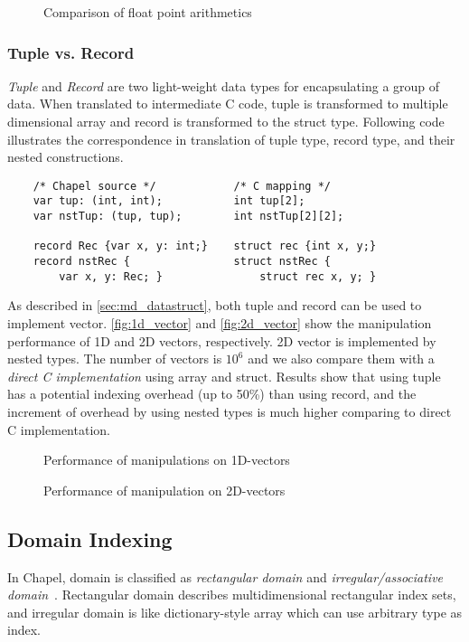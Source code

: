 \begin{figure}[t]
\centering

\caption{Comparison of float point arithmetics}
\label{fig:arith}
\end{figure}

\subsubsection{Tuple vs. Record}\label{sec:tuple_record}
{\em Tuple} and {\em Record} are two light-weight data types for encapsulating a
group of data. When translated to intermediate C code, tuple is transformed to
multiple dimensional array and record is transformed to the {\ic struct} type.
Following code illustrates the correspondence in translation of {\ic tuple}
type, {\ic record} type, and their nested constructions.

\begin{lstlisting}
    /* Chapel source */            /* C mapping */
    var tup: (int, int);           int tup[2];
    var nstTup: (tup, tup);        int nstTup[2][2];

    record Rec {var x, y: int;}    struct rec {int x, y;}
    record nstRec {                struct nstRec {
        var x, y: Rec; }               struct rec x, y; }
\end{lstlisting}

As described in \autoref{sec:md_datastruct}, both {\ic tuple} and {\ic
record} can be used to implement vector. \autoref{fig:1d_vector} and
\autoref{fig:2d_vector} show the manipulation performance of 1D and 2D vectors,
respectively. 2D vector is implemented by nested types. The number of vectors is
$10^6$ and we also compare them with a {\em direct C implementation} using array
and {\ic struct}. Results show that using {\ic tuple} has a potential indexing
overhead (up to 50\%) than using {\ic record}, and the increment of overhead by
using nested types is much higher comparing to direct C implementation.

\begin{figure}[t]
\centering

\caption{Performance of manipulations on 1D-vectors}
\label{fig:1d_vector}
\end{figure}

\begin{figure}[t]
\centering

\caption{Performance of manipulation on 2D-vectors}
\label{fig:2d_vector}
\end{figure}

\subsection{Domain Indexing}
In Chapel, domain is classified as {\em rectangular domain} and {\em
irregular/associative domain}~\cite{chapelspec}. Rectangular domain describes
multidimensional rectangular index sets, and irregular domain is like
dictionary-style array which can use arbitrary type as index.

